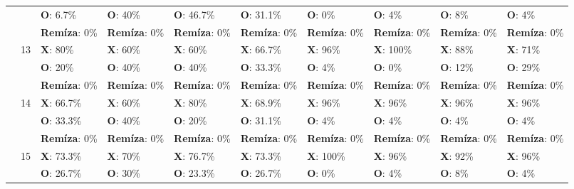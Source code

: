 \begin{table}[H]
\begin{tiny}
\begin{tabular}{|l|l|l|l|l||l|||l|l|l||l|}
            & & \textbf{O}: 6.7\% & \textbf{O}: 40\% & \textbf{O}: 46.7\% & \textbf{O}: 31.1\%                          & \textbf{O}: 0\% & \textbf{O}: 4\% & \textbf{O}: 8\% & \textbf{O}: 4\% \\
            & & \textbf{Remíza}: 0\% & \textbf{Remíza}: 0\% & \textbf{Remíza}: 0\% & \textbf{Remíza}: 0\%               & \textbf{Remíza}: 0\% & \textbf{Remíza}: 0\% & \textbf{Remíza}: 0\% & \textbf{Remíza}: 0\% \\
            \cline{2-10}
            & \multirow{3}{*}{13}
            & \textbf{X}: 80\% & \textbf{X}: 60\% & \textbf{X}: 60\% & \textbf{X}: 66.7\%                               & \textbf{X}: 96\% & \textbf{X}: 100\% & \textbf{X}: 88\% & \textbf{X}: 71\% \\
            & & \textbf{O}: 20\% & \textbf{O}: 40\% & \textbf{O}: 40\% & \textbf{O}: 33.3\%                             & \textbf{O}: 4\% & \textbf{O}: 0\% & \textbf{O}: 12\% & \textbf{O}: 29\% \\
            & & \textbf{Remíza}: 0\% & \textbf{Remíza}: 0\% & \textbf{Remíza}: 0\% & \textbf{Remíza}: 0\%               & \textbf{Remíza}: 0\% & \textbf{Remíza}: 0\% & \textbf{Remíza}: 0\% & \textbf{Remíza}: 0\% \\
            \cline{2-10}
            & \multirow{3}{*}{14}
            & \textbf{X}: 66.7\% & \textbf{X}: 60\% & \textbf{X}: 80\% & \textbf{X}: 68.9\%                             & \textbf{X}: 96\% & \textbf{X}: 96\% & \textbf{X}: 96\% & \textbf{X}: 96\% \\
            & & \textbf{O}: 33.3\% & \textbf{O}: 40\% & \textbf{O}: 20\% & \textbf{O}: 31.1\%                           & \textbf{O}: 4\% & \textbf{O}: 4\% & \textbf{O}: 4\% & \textbf{O}: 4\% \\
            & & \textbf{Remíza}: 0\% & \textbf{Remíza}: 0\% & \textbf{Remíza}: 0\% & \textbf{Remíza}: 0\%               & \textbf{Remíza}: 0\% & \textbf{Remíza}: 0\% & \textbf{Remíza}: 0\% & \textbf{Remíza}: 0\% \\
            \cline{2-10}
            & \multirow{3}{*}{15}
            & \textbf{X}: 73.3\% & \textbf{X}: 70\% & \textbf{X}: 76.7\% & \textbf{X}: 73.3\%                           & \textbf{X}: 100\% & \textbf{X}: 96\% & \textbf{X}: 92\% & \textbf{X}: 96\% \\
            & & \textbf{O}: 26.7\% & \textbf{O}: 30\% & \textbf{O}: 23.3\% & \textbf{O}: 26.7\%                         & \textbf{O}: 0\% & \textbf{O}: 4\% & \textbf{O}: 8\% & \textbf{O}: 4\% \\

\end{tabular}
\end{tiny}
\end{table}
